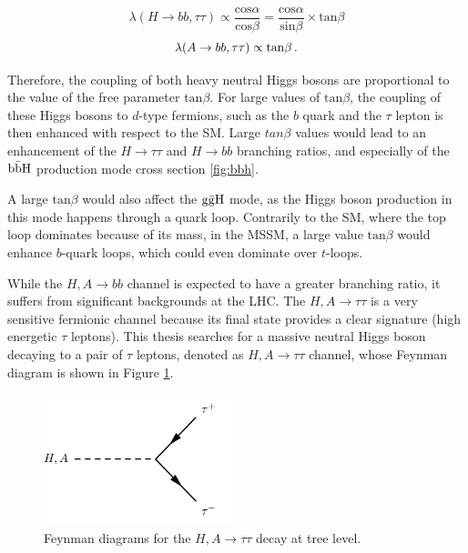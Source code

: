 \begin{equation}
    \lambda(H \rightarrow bb, \tau\tau) \propto \frac{\mathrm{cos} \alpha}{\mathrm{cos} \beta} = \frac{\mathrm{cos} \alpha}{\mathrm{sin} \beta} \times \mathrm{tan} \beta
\end{equation}
\begin{equation}
    \lambda(A \rightarrow bb, \tau\tau) \propto \mathrm{tan} \beta \mend
\end{equation}

Therefore, the coupling of both heavy neutral Higgs bosons are proportional to the value of the free parameter $\mathrm{tan} \beta$. For large values of $\mathrm{tan} \beta$, the coupling of these Higgs bosons to $d$-type fermions, such as the $b$ quark and the $\tau$ lepton is then enhanced with respect to the SM. Large $tan \beta$ values would lead to an enhancement of the $H \rightarrow \tau\tau$ and $H \rightarrow bb$ branching ratios, and especially of the $\mathrm{b\Bar{b}H}$ production mode cross section \ref{fig:bbh}.

A large $\mathrm{tan} \beta$ would also affect the $\mathrm{g\Bar{g}H}$ mode, as the Higgs boson production in this mode happens through a quark loop. Contrarily to the SM, where the top loop dominates because of its mass, in the MSSM, a large value $\mathrm{tan} \beta$ would enhance $b$-quark loops, which could even dominate over $t$-loops.\newline


While the $H,A \rightarrow bb$ channel is expected to have a greater branching ratio, it suffers from significant backgrounds at the LHC. The $H,A \rightarrow \tau\tau$ is a very sensitive fermionic channel because its final state provides a clear signature (high energetic $\tau$ leptons). This thesis searches for a massive neutral Higgs boson decaying to a pair of $\tau$ leptons, denoted as $H, A \rightarrow \tau\tau$ channel, whose Feynman diagram is shown in Figure \ref{fig:htt}.

\begin{figure}
    \centering
    \includegraphics[width=0.5\textwidth]{Images/htt.pdf}
    \caption{Feynman diagrams for the $H,A \rightarrow \tau\tau$ decay at tree level.}
    \label{fig:htt}
\end{figure}

